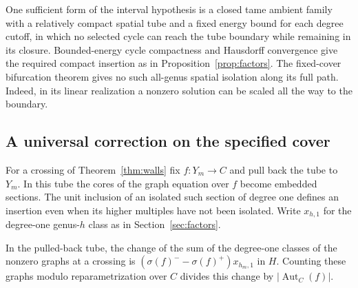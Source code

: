 One sufficient form of the interval hypothesis is a closed tame
ambient family with a relatively compact spatial tube and a
fixed energy bound for each degree cutoff, in which no selected cycle
can reach the tube boundary while remaining in its closure.
Bounded-energy cycle compactness and Hausdorff convergence give
the required compact insertion as in Proposition~\ref{prop:factors}.
The fixed-cover bifurcation theorem gives no such all-genus spatial
isolation along its full path. Indeed, in its linear realization a
nonzero solution can be scaled all the way to the boundary.

\subsection*{A universal correction on the specified cover}
For a crossing of Theorem~\ref{thm:walls} fix $f:Y_m\to C$ and
pull back the tube to $Y_m$. In this tube the cores of the graph
equation over $f$ become embedded sections. The unit inclusion
of an isolated such section of degree one defines an insertion even
when its higher multiples have not been isolated. Write
$x_{h,1}$ for the degree-one genus-$h$ class as in
Section~\ref{sec:factors}.

\begin{corollary}\label{cor:marked-wall}
In the pulled-back tube, the change of the sum of the degree-one
classes of the nonzero graphs at a crossing is
$(\sigma(f)^--\sigma(f)^+)x_{h_m,1}$ in $H$.
Counting these graphs modulo reparametrization over $C$ divides this
change by $|\operatorname{Aut}_C(f)|$.
\end{corollary}

